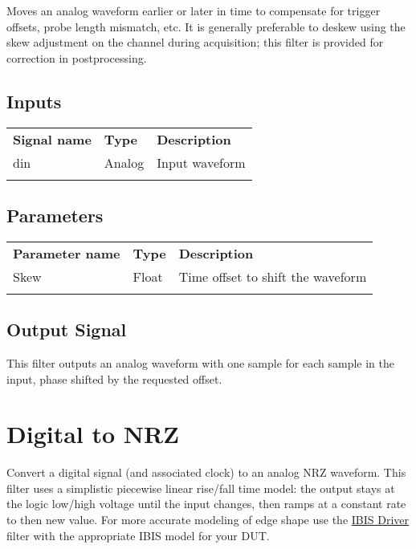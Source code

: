 Moves an analog waveform earlier or later in time to compensate for trigger offsets, probe length mismatch, etc.
It is generally preferable to deskew using the skew adjustment on the channel during acquisition; this filter is
provided for correction in postprocessing.

\subsection{Inputs}

\begin{tabularx}{16cm}{llX}
\thickhline
\textbf{Signal name} & \textbf{Type} & \textbf{Description} \\
\thickhline
din & Analog & Input waveform \\
\thickhline
\end{tabularx}

\subsection{Parameters}

\begin{tabularx}{16cm}{llX}
\thickhline
\textbf{Parameter name} & \textbf{Type} & \textbf{Description} \\
\thickhline
Skew & Float & Time offset to shift the waveform\\
\thickhline
\end{tabularx}

\subsection{Output Signal}

This filter outputs an analog waveform with one sample for each sample in the input, phase shifted by the requested
offset.

\pagebreak
\section{Digital to NRZ}
\label{filter:digitaltonrz}

Convert a digital signal (and associated clock) to an analog NRZ waveform. This filter uses a simplistic piecewise
linear rise/fall time model: the output stays at the logic low/high voltage until the input changes, then ramps at a
constant rate to then new value. For more accurate modeling of edge shape use the \hyperref[filter:ibisdriver]{IBIS
Driver} filter with the appropriate IBIS model for your DUT.

